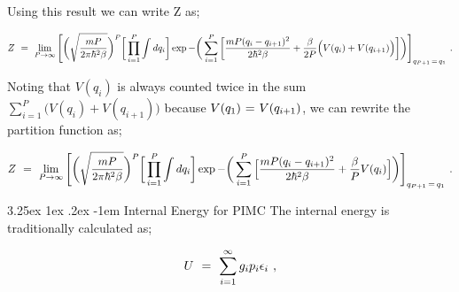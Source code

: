 \documentclass{article}
\makeatletter
\renewcommand\subparagraph{\@startsection{subparagraph}{6}{\parindent}%
  {3.25ex \@plus1ex \@minus .2ex}%
  {-1em}%
  {\normalfont\normalsize\bfseries}}
\makeatother
\begin{document}
Using this result we can write Z as;

\begin{equation} \label{eb-eq-1-208}
Z \hspace{0.125cm} = \hspace{0.125cm} \lim_{P \rightarrow \infty} \Bigg[ \bigg(\sqrt{\frac{m P}{2 \pi \hbar^2 \beta}}\bigg)^{P} \bigg[ \prod_{i=1}^{P} \int d q_i \bigg] \exp{- \bigg( \sum_{i = 1}^{P} \bigg[ \frac{ m P (q_i - q_{i+1})^2}{2 \hbar^2 \beta} + \frac{\beta}{2P} \Big( V(q_i) + V(q_{i + 1}) \Big) \bigg] \bigg)} \Bigg]_{q_{P + 1} \hspace{0.05cm} = \hspace{0.05cm} q_1} \hspace{0.125cm} .
\end{equation}

Noting that \begin{math} V(q_i) \end{math} is always counted twice in the sum \begin{math} \sum_{i = 1}^{P} \Big( V(q_i) + V(q_{i + 1}) \Big) \end{math} because \begin{math} V(q_1) \hspace{0.025cm} = \hspace{0.025cm} V(q_{i + 1}) \end{math}, we can rewrite the partition function as; 

\begin{equation} \label{eb-eq-1-209}
Z \hspace{0.125cm} = \hspace{0.125cm} \lim_{P \rightarrow \infty} \Bigg[ \bigg(\sqrt{\frac{m P}{2 \pi \hbar^2 \beta}}\bigg)^{P} \bigg[ \prod_{i=1}^{P} \int d q_i \bigg] \exp{- \bigg( \sum_{i = 1}^{P} \Big[ \frac{ m P (q_i - q_{i+1})^2}{2 \hbar^2 \beta} + \frac{\beta}{P} V(q_i) \Big] \bigg)} \Bigg]_{q_{P + 1} \hspace{0.05cm} = \hspace{0.05cm} q_1} \hspace{0.125cm} .
\end{equation}

\subparagraph{Internal Energy for PIMC}
The internal energy is traditionally calculated as;

\begin{equation} \label{eb-eq-1-210}
U \hspace{0.125cm} = \hspace{0.125cm} \sum_{i = 1}^{\infty} g_i p_i \epsilon_{i} \hspace{0.125cm} ,
\end{equation}
\end{document}
